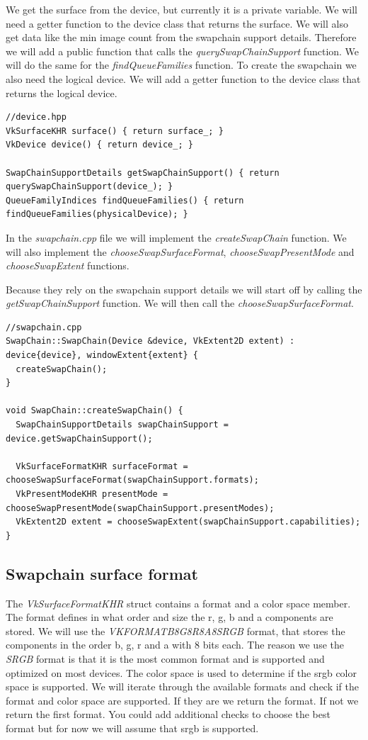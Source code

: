\documentclass[12pt]{report} \usepackage{preamble}
\begin{document}
We get the surface from the device, but currently it is a private variable. We will
need a getter function to the device class that returns the surface. We will also get
data like the min image count from the swapchain support details. Therefore we will add
a public function that calls the \textit{querySwapChainSupport} function. We will do the same
for the \textit{findQueueFamilies} function. To create the swapchain we also need the
logical device. We will add a getter function to the device class that returns the logical
device.

\begin{lstlisting}[Language=C++]
//device.hpp
VkSurfaceKHR surface() { return surface_; }
VkDevice device() { return device_; }

SwapChainSupportDetails getSwapChainSupport() { return querySwapChainSupport(device_); }
QueueFamilyIndices findQueueFamilies() { return findQueueFamilies(physicalDevice); }
\end{lstlisting}

In the \textit{swapchain.cpp} file we will implement the \textit{createSwapChain} function.
We will also implement the \textit{chooseSwapSurfaceFormat}, \textit{chooseSwapPresentMode}
and \textit{chooseSwapExtent} functions.

Because they rely on the swapchain support details we will start off by calling the
\textit{getSwapChainSupport} function. We will then call the \textit{chooseSwapSurfaceFormat}.

\begin{lstlisting}[Language=C++]
//swapchain.cpp
SwapChain::SwapChain(Device &device, VkExtent2D extent) : device{device}, windowExtent{extent} {
  createSwapChain();
}

void SwapChain::createSwapChain() {
  SwapChainSupportDetails swapChainSupport = device.getSwapChainSupport();

  VkSurfaceFormatKHR surfaceFormat = chooseSwapSurfaceFormat(swapChainSupport.formats);
  VkPresentModeKHR presentMode = chooseSwapPresentMode(swapChainSupport.presentModes);
  VkExtent2D extent = chooseSwapExtent(swapChainSupport.capabilities);
}
\end{lstlisting}

\subsection{Swapchain surface format}

The \textit{VkSurfaceFormatKHR} struct contains a format and a color space member. The format
defines in what order and size the r, g, b and a components are stored. We will use the
\textit{VK\textunderscore FORMAT\textunderscore B8G8R8A8\textunderscore SRGB} format, that stores
the components in the order b, g, r and a with 8 bits each. The reason
we use the \textit{SRGB} format is that it is the most common format and is supported and optimized
on most devices. The color space is used to determine if the srgb color space is supported. We will
iterate through the available formats and check if the format and color space are supported. If they
are we return the format. If not we return the first format. You could add additional checks to
choose the best format but for now we will assume that srgb is supported.
\end{document}
